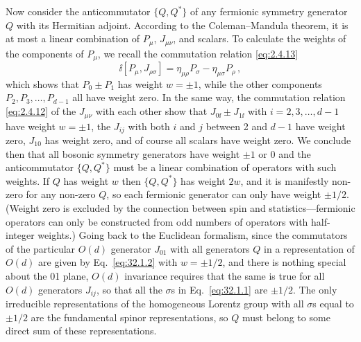 Now consider the anticommutator \(\{Q,Q^*\}\) of any fermionic symmetry
generator \(Q\) with its Hermitian adjoint. According to the
Coleman--Mandula theorem, it is at most a linear combination of \(P_\mu\),
\(J_{\mu\nu}\), and scalars. To calculate the weights of the components of
\(P_\mu\), we recall the commutation relation \eqref{eq:2.4.13}
\[
  \ii[P_\mu,J_{\rho\sigma}]
  =\eta_{\mu\rho}P_\sigma-\eta_{\mu\sigma}P_\rho\,,
\]
which shows that \(P_0\pm P_1\) has weight \(w=\pm1\), while the other
components \(P_2,P_3,\ldots,P_{d-1}\) all have weight zero. In the same
way, the commutation relation \eqref{eq:2.4.12} of the \(J_{\mu\nu}\) with
each other show that \(J_{0\ii}\pm J_{1\ii}\) with \(i=2,3,\ldots,d-1\) have
weight \(w=\pm1\), the \(J_{ij}\) with both \(i\) and \(j\) between 2 and
\(d-1\) have weight zero, \(J_{10}\) has weight zero, and of course all
scalars have weight zero. We conclude then that all bosonic symmetry
generators have weight \(\pm1\) or 0 and the anticommutator \(\{Q,Q^*\}\)
must be a linear combination of operators with such weights. If \(Q\) has
weight \(w\) then \(\{Q,Q^*\}\) has weight \(2w\), and it is manifestly
non-zero for any non-zero \(Q\), so each fermionic generator can only have
weight \(\pm1/2\). (Weight zero is excluded by the connection between spin
and statistics---fermionic operators can only be constructed from odd
numbers of operators with half-integer weights.) Going back to the
Euclidean formalism, since the commutators of the particular \(O(d)\)
generator \(J_{01}\) with all generators \(Q\) in a representation of
\(O(d)\) are given by Eq.~\eqref{eq:32.1.2} with \(w=\pm1/2\), and there
is nothing special about the 01 plane, \(O(d)\) invariance requires that
the same is true for all \(O(d)\) generators \(J_{ij}\), so that all the
\(\sigma\)s in Eq.~\eqref{eq:32.1.1} are \(\pm1/2\). The only irreducible
representations of the homogeneous Lorentz group with all \(\sigma\)s equal
to \(\pm1/2\) are the fundamental spinor representations, so \(Q\) must
belong to some direct sum of these representations.

